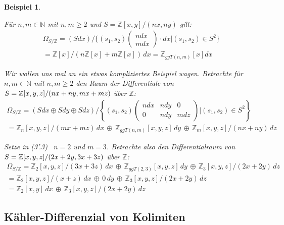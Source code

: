 \documentclass[10pt,a4paper]{report}
\newcounter{Aussage}[chapter]
\newtheorem{bsp}[Aussage]{Beispiel}
\newcommand{\divR}[2]{\Omega_{#1/#2}}
\begin{document}
\begin{bsp}
\begin{itemize}
{\item[(3'.2)] Für $n,m \in \mathbb{N}$ mit $n,m \geq 2$ und $S = \mathbb{Z}[x,y]/(nx,ny)$ gilt:
\begin{gather*}
\divR{S}{\mathbb{Z}}
= (S dx)/\lbrace (s_1,s_2)
\begin{pmatrix}
ndx\\
mdx
\end{pmatrix}
 \cdot dx \vert (s_1,s_2) \in S^2 \rbrace \\
= \mathbb{Z}[x]/ \left(n\mathbb{Z}[x] + m\mathbb{Z}[x]\right) \, dx 
= \mathbb{Z}_{ggT(n,m)}[x]dx
\end{gather*}

\item[(3'.3)] Wir wollen uns mal an ein etwas kompliziertes Beispiel wagen. Betrachte für $n,m \in \mathbb{N}$ mit $n,m \geq 2$ den Raum der Differentiale von \\$S = \nolinebreak{\mathbb{Z}[x,y,z]/(nx + ny, mx + mz)}$ über $\mathbb{Z}$:
\begin{gather*}
\divR{S}{\mathbb{Z}}
= (Sdx \oplus Sdy \oplus Sdz)/\left\lbrace (s_1,s_2) 
\begin{pmatrix}
ndx & ndy & 0\\
0   & ndy & mdz
\end{pmatrix}
\vert (s_1,s_2) \in S^2 \right\rbrace\\
=\mathbb{Z}_n[x,y,z]/(mx + mz) \, dx \, \oplus \, \mathbb{Z}_{ggT(n,m)}[x,y,z] \, dy \, \oplus \, \mathbb{Z}_m[x,y,z]/(nx + ny) \, dz
\end{gather*}

\item[(3'.4)] Setze in \textit{(3'.3)} \, $n = 2$ und $m = 3$. Betrachte also den Differentialraum von \\
$\nolinebreak{S = \mathbb{Z}[x,y,z]/(2x + 2y, 3x + 3z)}$ über $\mathbb{Z}$:
\begin{gather*}
\divR{S}{\mathbb{Z}}
=\mathbb{Z}_2[x,y,z]/(3x + 3z) \, dx \, \oplus \, \mathbb{Z}_{ggT(2,3)}[x,y,z] \, dy \, \oplus \, \mathbb{Z}_3[x,y,z]/(2x + 2y) \, dz \\
= \mathbb{Z}_2[x,y,z]/(x + z) \, dx \, \oplus \, 0 \, dy \, \oplus \, \mathbb{Z}_3[x,y,z]/(2x + 2y) \, dz\\
= \mathbb{Z}_2[x,y] \, dx \, \oplus \, \mathbb{Z}_3[x,y,z]/(2x + 2y) \, dz
\end{gather*}
}
\end{itemize}
\end{bsp}

\subsection{Kähler-Differenzial von Kolimiten}
\end{document}
